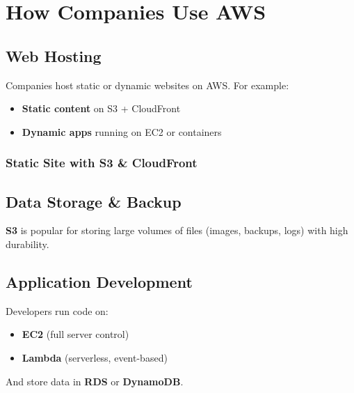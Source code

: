 \documentclass[12pt]{article}
\begin{document}
\clearpage

\section{How Companies Use AWS}
\justifying

\subsection{Web Hosting}
Companies host static or dynamic websites on AWS. For example:
\begin{itemize}
    \item \textbf{Static content} on S3 + CloudFront
    \item \textbf{Dynamic apps} running on EC2 or containers
\end{itemize}

\vspace{-0.3cm}
\subsubsection{Static Site with S3 \& CloudFront}
\begin{center}
\end{center}

\subsection{Data Storage \& Backup}
\textbf{S3} is popular for storing large volumes of files (images, backups, logs) with high durability.

\subsection{Application Development}
Developers run code on:
\begin{itemize}
    \item \textbf{EC2} (full server control)
    \item \textbf{Lambda} (serverless, event-based)
\end{itemize}
And store data in \textbf{RDS} or \textbf{DynamoDB}.
\end{document}
